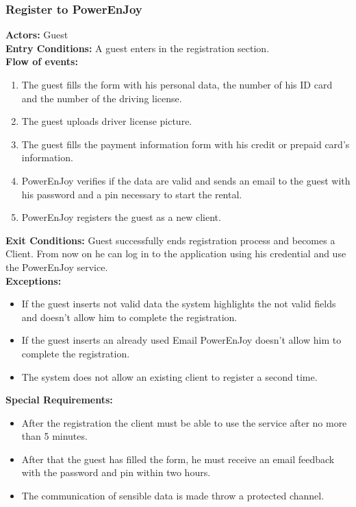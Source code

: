 \subsubsection{Register to PowerEnJoy}
%
\textbf{Actors:}
Guest\\
%
\textbf{Entry Conditions:}
A guest enters in the registration section.\\ 
%
\textbf{Flow of events:}
\begin{enumerate}
\item The guest fills the form with his personal data, the number of his ID card and the number of the driving license. 
\item The guest uploads driver license picture.
\item  The guest fills the payment information form with his credit or prepaid card's information. 
\item PowerEnJoy verifies if the data are valid and sends an email to the guest with his password and a pin necessary to start the rental. 
\item PowerEnJoy registers the guest as a new client. 
\end{enumerate}
%
\textbf{Exit Conditions:}
Guest successfully ends registration process and becomes a Client. From now on he can log in to the application using his credential and use the PowerEnJoy service. \\ 
%
\textbf{Exceptions:}
\begin{itemize}
\item If the guest inserts not valid data the system highlights the not valid fields and doesn't allow him to complete the registration.
\item If the guest inserts an already used Email PowerEnJoy doesn't allow him to complete the registration.
\item The system does not allow an existing client to register a second time.
\end{itemize}
%
\textbf{Special Requirements:}
\begin{itemize}
\item After the registration the client must be able to use the service after no more than 5 minutes.
\item After that the guest has filled the form, he must receive an email feedback with the password and pin within two hours.
\item The communication of sensible data is made throw a protected channel.
\end{itemize}


